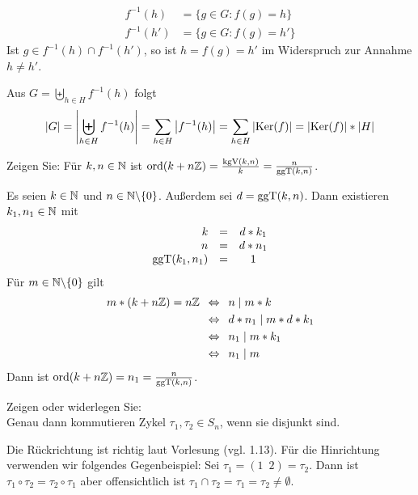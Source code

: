 \begin{exercisePage}
\begin{solution}
\begin{itemize}
\begin{align*}
			f^{-1}(h) & = \{ g \in G : f(g) = h \} \\
			f^{-1}(h') & = \{ g \in G : f(g) = h' \}
		\end{align*}
		Ist $g \in f^{-1}(h) \cap f^{-1}(h')$, so ist $h = f(g) = h'$ im Widerspruch zur Annahme $h \neq h'$. \par
		Aus $G = \biguplus \limits_{h \in H}{f^{-1}(h)}$ folgt 
		\begin{equation*}
			\left| G \right| = \left| \biguplus \limits_{h \in H}{f^{-1}(h)} \right| 
            = \sum\limits_{h \in H}{\left| f^{-1}(h) \right|}
			= \sum\limits_{h \in H}{\left| \operatorname{Ker}(f) \right|}
			= \left| \operatorname{Ker}(f) \right| * \left| H \right|
		\end{equation*}
	\end{itemize}
\end{solution}
%
\pagebreak
%
\begin{exercise}
	Zeigen Sie: Für $k,n \in \mathbb{N}$ ist $\operatorname{ord}(k+n\mathbb{Z}) = \frac{\operatorname{kgV}(k,n)}{k} = \frac{n}{\operatorname{ggT}(k,n)}$.
\end{exercise}
\begin{solution}
	Es seien $k \in \mathbb{N}$ und $n \in \mathbb{N} \backslash \{0\}$. Außerdem sei $d = \operatorname{ggT}(k,n)$. Dann existieren $k_1, n_1 \in \mathbb{N}$ mit 
	\begin{align*}
		\begin{array}{rcc}
		k &=& d * k_1 \\ n &=& d * n_1 \\ \operatorname{ggT}(k_1, n_1) &=& 1
		\end{array}
	\end{align*}
	Für $m \in \mathbb{N} \backslash \{ 0 \}$ gilt 
	\begin{align*}
		m * (k + n\mathbb{Z}) = n\mathbb{Z} & \enskip \Leftrightarrow \enskip n \mid  m*k \\
		& \enskip \Leftrightarrow \enskip d * n_1 \mid m * d * k_1 \\
		& \enskip \Leftrightarrow \enskip n_1 \mid m * k_1 \\
		& \enskip \Leftrightarrow \enskip n_1 \mid m
	\end{align*}
	Dann ist $\operatorname{ord}(k + n\mathbb{Z}) = n_1 = \frac{n}{\operatorname{ggT}(k,n)}$.
\end{solution}
%
\setcounter{taskcount}{16}
%
\begin{exercise} [Präsenz]
	Zeigen oder widerlegen Sie: \\
	Genau dann kommutieren Zykel $\tau_1, \tau_2 \in S_n$, wenn sie disjunkt sind.
\end{exercise}
\begin{solution}
	Die Rückrichtung ist richtig laut Vorlesung (vgl. 1.13). Für die Hinrichtung verwenden wir folgendes Gegenbeispiel: Sei $\tau_1=(1 \enspace 2) = \tau_2$. Dann ist $\tau_1 \circ \tau_2 = \tau_2 \circ \tau_1$ aber offensichtlich ist $\tau_1 \cap \tau_2 = \tau_1 = \tau_2 \neq \emptyset$.
\end{solution}


\end{exercisePage}
